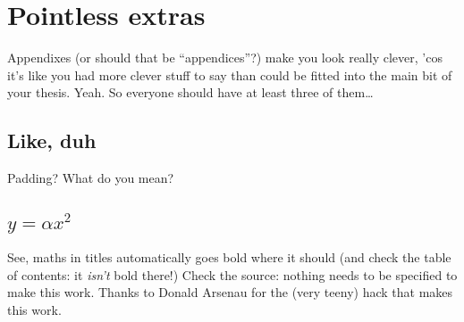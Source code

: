 \chapter{Pointless extras}
\label{app:Pointless}
Appendixes (or should that be ``appendices''?) make you look really clever, 'cos
it's like you had more clever stuff to say than could be fitted into the main
bit of your thesis. Yeah. So everyone should have at least three of them\dots

\section{Like, duh}
\label{sec:Duh}
Padding? What do you mean?

\section{$y = \alpha x^2$}
\label{sec:EqnTitle}
See, maths in titles automatically goes bold where it should (and check the 
table of contents: it \emph{isn't} bold there!) Check the source: nothing
needs to be specified to make this work. Thanks to Donald Arsenau for the
(very teeny) hack that makes this work.

%
